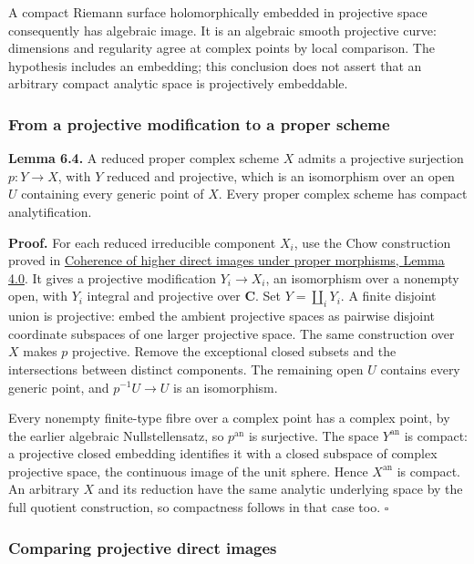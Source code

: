 \documentclass[11pt]{article}
\begin{document}
A compact Riemann surface holomorphically embedded in projective space
consequently has algebraic image. It is an algebraic smooth projective
curve: dimensions and regularity agree at complex points by local
comparison. The hypothesis includes an embedding; this conclusion does
not assert that an arbitrary compact analytic space is projectively
embeddable.

\subsubsection{From a projective modification to a proper
scheme}\label{from-a-projective-modification-to-a-proper-scheme}

\textbf{Lemma 6.4.} A reduced proper complex scheme \(X\) admits a
projective surjection \(p:Y\to X\), with \(Y\) reduced and projective,
which is an isomorphism over an open \(U\) containing every generic
point of \(X\). Every proper complex scheme has compact analytification.

\textbf{Proof.} For each reduced irreducible component \(X_i\), use the
Chow construction proved in
\href{proper-morphisms-and-coherent-direct-images.html\#4-a-projective-modification-supplies-the-witness}{Coherence
of higher direct images under proper morphisms, Lemma 4.0}. It gives a
projective modification \(Y_i\to X_i\), an isomorphism over a nonempty
open, with \(Y_i\) integral and projective over \(\mathbf C\). Set
\(Y=\coprod_iY_i\). A finite disjoint union is projective: embed the
ambient projective spaces as pairwise disjoint coordinate subspaces of
one larger projective space. The same construction over \(X\) makes
\(p\) projective. Remove the exceptional closed subsets and the
intersections between distinct components. The remaining open \(U\)
contains every generic point, and \(p^{-1}U\to U\) is an isomorphism.

Every nonempty finite-type fibre over a complex point has a complex
point, by the earlier algebraic Nullstellensatz, so \(p^{\mathrm{an}}\)
is surjective. The space \(Y^{\mathrm{an}}\) is compact: a projective
closed embedding identifies it with a closed subspace of complex
projective space, the continuous image of the unit sphere. Hence
\(X^{\mathrm{an}}\) is compact. An arbitrary \(X\) and its reduction
have the same analytic underlying space by the full quotient
construction, so compactness follows in that case too. \(\square\)

\subsubsection{Comparing projective direct
images}\label{comparing-projective-direct-images}
\end{document}
